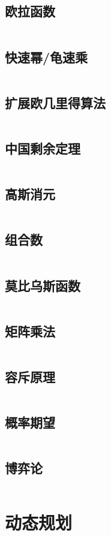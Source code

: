 \documentclass[a4paper,12pt]{article}
\begin{document}
\subsection{欧拉函数}
\inputminted[breaklines]{c++}{math/eluer.cc}
\subsection{快速幂/龟速乘}
\inputminted[breaklines]{c++}{math/qmi.cc}
\subsection{扩展欧几里得算法}
\inputminted[breaklines]{c++}{math/exgcd.cc}
\subsection{中国剩余定理}
\inputminted[breaklines]{c++}{math/crt.cc}
\subsection{高斯消元}
\inputminted[breaklines]{c++}{math/gauss.cc}
\subsection{组合数}
\inputminted[breaklines]{c++}{math/combine.cc}
\subsection{莫比乌斯函数}
\inputminted[breaklines]{c++}{math/mobius.cc}
\subsection{矩阵乘法}
\inputminted[breaklines]{c++}{math/matrix.cc}
\subsection{容斥原理}
\inputminted[breaklines]{c++}{math/rongchi.cc}
\subsection{概率期望}
\inputminted[breaklines]{c++}{math/qiwang.cc}
\subsection{博弈论}
\inputminted[breaklines]{c++}{math/game.cc}

\newpage
\section{动态规划}
\end{document}
